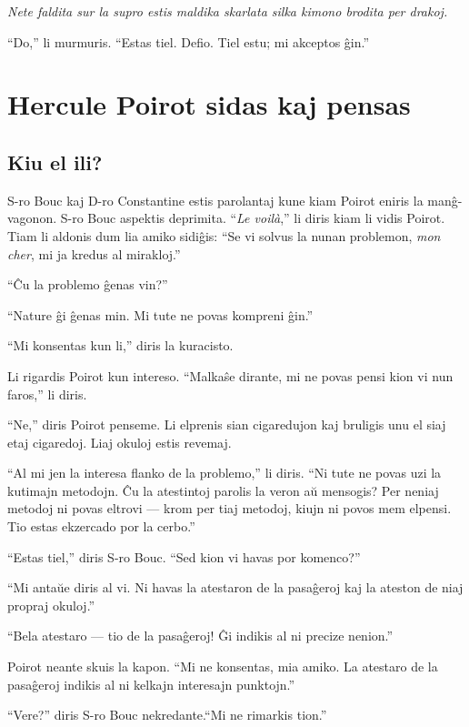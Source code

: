 \emph{Nete faldita sur la supro estis maldika skarlata silka kimono brodita per drakoj.}

``Do,'' li murmuris. ``Estas tiel. Defio. Tiel estu; mi akceptos ĝin.''

\part{Hercule Poirot sidas kaj pensas}
\renewcommand*{\theHchapter}{chX.\the\value{chapter}}
\setcounter{chapter}{0}


\chapter[Kiu el ili?]{Kiu el ili?}


S-ro Bouc kaj D-ro Constantine estis parolantaj kune kiam Poirot eniris la manĝ-vagonon. S-ro Bouc aspektis deprimita. ``\emph{Le voilà},'' li diris kiam li vidis Poirot. Tiam li aldonis dum lia amiko sidiĝis: ``Se vi solvus la nunan problemon, \emph{mon cher}, mi ja kredus al mirakloj.''

``Ĉu la problemo ĝenas vin?''

``Nature ĝi ĝenas min. Mi tute ne povas kompreni ĝin.''

``Mi konsentas kun li,'' diris la kuracisto.

Li rigardis Poirot kun intereso. ``Malkaŝe dirante, mi ne povas pensi kion vi nun faros,'' li diris.

``Ne,'' diris Poirot penseme. Li elprenis sian cigaredujon kaj bruligis unu el siaj etaj cigaredoj. Liaj okuloj estis revemaj.

``Al mi jen la interesa flanko de la problemo,'' li diris. ``Ni tute ne povas uzi la kutimajn metodojn. Ĉu la atestintoj parolis la veron aŭ mensogis? Per neniaj metodoj ni povas eltrovi --- krom per tiaj metodoj, kiujn ni povos mem elpensi. Tio estas ekzercado por la cerbo.''

``Estas tiel,'' diris S-ro Bouc. ``Sed kion vi havas por komenco?''

``Mi antaŭe diris al vi. Ni havas la atestaron de la pasaĝeroj kaj la ateston de niaj propraj okuloj.''

``Bela atestaro --- tio de la pasaĝeroj! Ĝi indikis al ni precize nenion.''

Poirot neante skuis la kapon. ``Mi ne konsentas, mia amiko. La atestaro de la pasaĝeroj indikis al ni kelkajn interesajn punktojn.''

``Vere?'' diris S-ro Bouc nekredante.``Mi ne rimarkis tion.''


